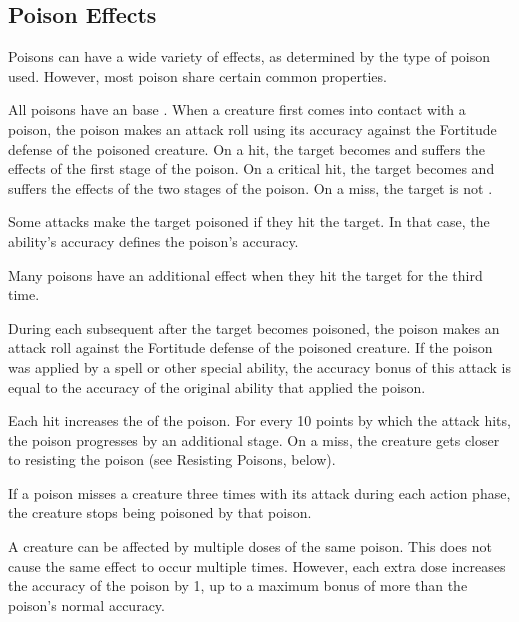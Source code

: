     \subsection{Poison Effects}\label{Poison Effects}

        Poisons can have a wide variety of effects, as determined by the type of poison used.
        However, most poison share certain common properties.

        All poisons have an base .
        When a creature first comes into contact with a poison, the poison makes an attack roll using its accuracy against the Fortitude defense of the poisoned creature.
        On a hit, the target becomes  and suffers the effects of the first stage of the poison.
        On a critical hit, the target becomes  and suffers the effects of the two stages of the poison.
        On a miss, the target is not .

        Some attacks make the target poisoned if they hit the target.
        In that case, the ability's accuracy defines the poison's accuracy.

        Many poisons have an additional effect when they hit the target for the third time.

        During each subsequent  after the target becomes poisoned, the poison makes an attack roll against the Fortitude defense of the poisoned creature.
        If the poison was applied by a spell or other special ability, the accuracy bonus of this attack is equal to the accuracy of the original ability that applied the poison.

        Each hit increases the  of the poison.
        For every 10 points by which the attack hits, the poison progresses by an additional stage.
        On a miss, the creature gets closer to resisting the poison (see Resisting Poisons, below).

        If a poison misses a creature three times with its attack during each action phase, the creature stops being poisoned by that poison.

        A creature can be affected by multiple doses of the same poison.
        This does not cause the same effect to occur multiple times.
        However, each extra dose increases the accuracy of the poison by 1, up to a maximum bonus of  more than the poison's normal accuracy.

